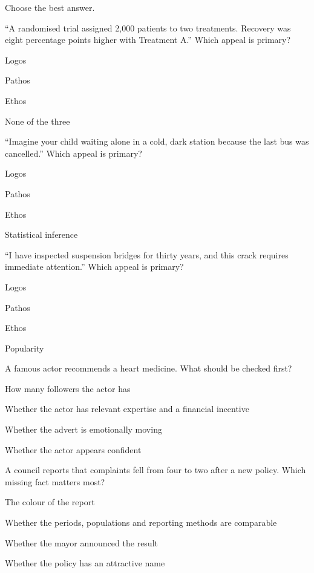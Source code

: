 \documentclass[a4paper,nofonts,sfsidenotes]{tufte-handout}
\begin{document}
Choose the best answer.

\begin{exercisequestions}
  \item \enquote{A randomised trial assigned 2,000 patients to two treatments.
    Recovery was eight percentage points higher with Treatment A.}
    Which appeal is primary?
    \begin{choices}
      \item Logos
      \item Pathos
      \item Ethos
      \item None of the three
    \end{choices}

  \item \enquote{Imagine your child waiting alone in a cold, dark station
    because the last bus was cancelled.}
    Which appeal is primary?
    \begin{choices}
      \item Logos
      \item Pathos
      \item Ethos
      \item Statistical inference
    \end{choices}

  \item \enquote{I have inspected suspension bridges for thirty years, and this
    crack requires immediate attention.}
    Which appeal is primary?
    \begin{choices}
      \item Logos
      \item Pathos
      \item Ethos
      \item Popularity
    \end{choices}

  \item A famous actor recommends a heart medicine. What should be checked
    first?
    \begin{choices}
      \item How many followers the actor has
      \item Whether the actor has relevant expertise and a financial incentive
      \item Whether the advert is emotionally moving
      \item Whether the actor appears confident
    \end{choices}

  \item A council reports that complaints fell from four to two after a new
    policy. Which missing fact matters most?
    \begin{choices}
      \item The colour of the report
      \item Whether the periods, populations and reporting methods are comparable
      \item Whether the mayor announced the result
      \item Whether the policy has an attractive name
    \end{choices}


\end{exercisequestions}
\end{document}
